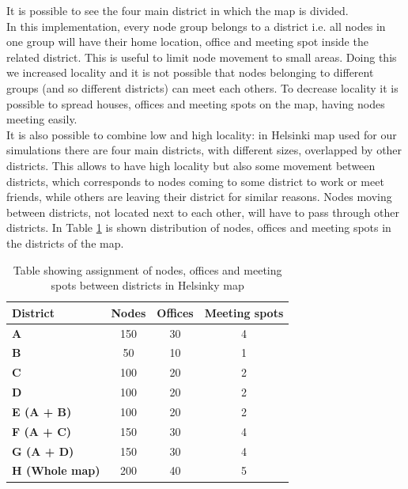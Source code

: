 It is possible to see the four main district in which the map is divided. 
\\

In this implementation, every node group belongs to a district i.e. all nodes in one group will have their home location, office and meeting spot inside the related district. This is useful to limit node movement to small areas. Doing this we increased locality and it is not possible that nodes belonging to different groups (and so different districts) can meet each others. To decrease locality it is possible to spread houses, offices and meeting spots on the map, having nodes meeting easily.
\\

It is also possible to combine low and high locality: in Helsinki map used for our simulations there are four main districts, with different sizes, overlapped by other districts. This allows to have high locality but also some movement between districts, which corresponds to nodes coming to some district to work or meet friends, while others are leaving their district for similar reasons. Nodes moving between districts, not located next to each other, will have to pass through other districts. In Table \ref{tabellaDistrettiMappa} is shown distribution of nodes, offices and meeting spots in the districts of the map.

\begin{table}[h]
\begin{center}
\begin{tabular}{|l|c|c|c|}
\hline
\textbf{District} & \textbf{Nodes} & \textbf{Offices} & \textbf{Meeting spots}\\
\hline
\hline
\bfseries A & 150 & 30 & 4 \\
\hline
\bfseries B & 50 & 10 & 1 \\
\hline
\bfseries C & 100 & 20 & 2 \\
\hline
\bfseries D & 100 & 20 & 2 \\
\hline
\bfseries E (A + B) & 100 & 20 & 2 \\
\hline
\bfseries F (A + C) & 150 & 30 & 4 \\
\hline
\bfseries G (A + D) & 150 & 30 & 4 \\
\hline
\bfseries H (Whole map) & 200 & 40 & 5 \\
\hline
\end{tabular}
\end{center}
\caption[Helsinky map districts]{Table showing assignment of nodes, offices and meeting spots between districts in Helsinky map}    
\label{tabellaDistrettiMappa}
\end{table}


